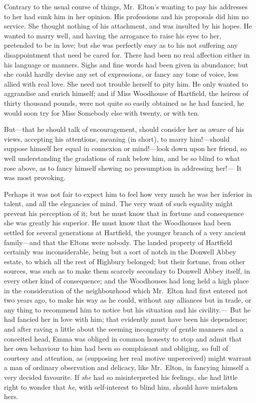 Contrary to the usual course of things, Mr.\ Elton's wanting
to pay his addresses to her had sunk him in her opinion.
His professions and his proposals did him no service.  She thought
nothing of his attachment, and was insulted by his hopes.
He wanted to marry well, and having the arrogance to raise his
eyes to her, pretended to be in love; but she was perfectly easy
as to his not suffering any disappointment that need be cared for.
There had been no real affection either in his language or manners.
Sighs and fine words had been given in abundance; but she could
hardly devise any set of expressions, or fancy any tone of voice,
less allied with real love.  She need not trouble herself to pity him.
He only wanted to aggrandise and enrich himself; and if Miss Woodhouse
of Hartfield, the heiress of thirty thousand pounds, were not quite
so easily obtained as he had fancied, he would soon try for Miss
Somebody else with twenty, or with ten.

But---that he should talk of encouragement, should consider her as
aware of his views, accepting his attentions, meaning (in short),
to marry him!---should suppose himself her equal in connexion
or mind!---look down upon her friend, so well understanding the
gradations of rank below him, and be so blind to what rose above,
as to fancy himself shewing no presumption in addressing her!---%
It was most provoking.

Perhaps it was not fair to expect him to feel how very much he
was her inferior in talent, and all the elegancies of mind.
The very want of such equality might prevent his perception of it;
but he must know that in fortune and consequence she was greatly
his superior.  He must know that the Woodhouses had been settled
for several generations at Hartfield, the younger branch
of a very ancient family---and that the Eltons were nobody.
The landed property of Hartfield certainly was inconsiderable,
being but a sort of notch in the Donwell Abbey estate, to which all
the rest of Highbury belonged; but their fortune, from other sources,
was such as to make them scarcely secondary to Donwell Abbey itself,
in every other kind of consequence; and the Woodhouses had long
held a high place in the consideration of the neighbourhood which
Mr.\ Elton had first entered not two years ago, to make his way
as he could, without any alliances but in trade, or any thing
to recommend him to notice but his situation and his civility.---%
But he had fancied her in love with him; that evidently must
have been his dependence; and after raving a little about the
seeming incongruity of gentle manners and a conceited head,
Emma was obliged in common honesty to stop and admit that her own
behaviour to him had been so complaisant and obliging, so full of
courtesy and attention, as (supposing her real motive unperceived)
might warrant a man of ordinary observation and delicacy,
like Mr.\ Elton, in fancying himself a very decided favourite.  If \emph{she}
had so misinterpreted his feelings, she had little right to wonder
that \emph{he}, with self-interest to blind him, should have mistaken hers.

